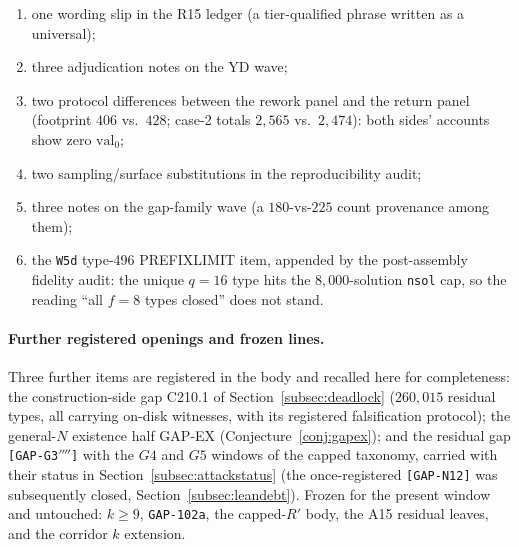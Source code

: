 \begin{enumerate}[label=\textbf{R\arabic*.},leftmargin=2.6em,itemsep=0.05em]
\item one wording slip in the R15 ledger (a tier-qualified phrase written as a universal);
\item three adjudication notes on the YD wave;
\item two protocol differences between the rework panel and the return panel (footprint
  $406$ vs.\ $428$; case-2 totals $2{,}565$ vs.\ $2{,}474$): both sides' accounts show zero
  $\mathrm{val}_0$;
\item two sampling/surface substitutions in the reproducibility audit;
\item three notes on the gap-family wave (a $180$-vs-$225$ count provenance among them);
\item the \texttt{W5d} type-496 PREFIXLIMIT item, appended by the post-assembly fidelity
  audit: the unique $q{=}16$ type hits the $8{,}000$-solution \texttt{nsol} cap, so the
  reading ``all $f{=}8$ types closed'' does not stand.
\end{enumerate}

\paragraph{Further registered openings and frozen lines.} Three further items are registered
in the body and recalled here for completeness: the construction-side gap C210.1 of
Section~\ref{subsec:deadlock} ($260{,}015$ residual types, all carrying on-disk witnesses,
with its registered falsification protocol); the general-$N$ existence half GAP-EX
(Conjecture~\ref{conj:gapex}); and the residual gap \texttt{[GAP-G3$''''$]} with the $G4$ and
$G5$ windows of the capped taxonomy, carried with their status in
Section~\ref{subsec:attackstatus} (the once-registered \texttt{[GAP-N12]} was subsequently
closed, Section~\ref{subsec:leandebt}). Frozen for the present window and untouched:
$k\ge9$, \texttt{GAP-102a}, the capped-$R'$ body, the A15 residual leaves, and the corridor
$k$ extension.
